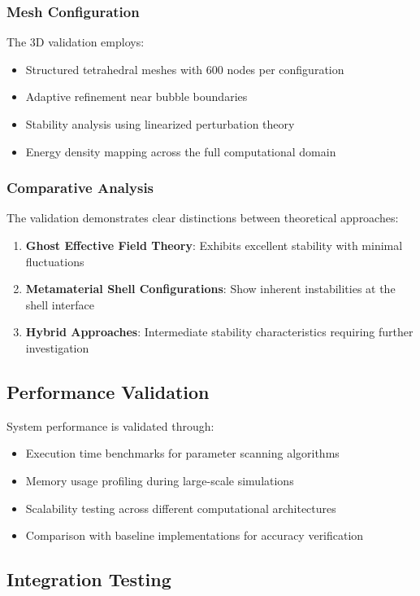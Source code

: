\documentclass[12pt]{article}
\begin{document}
\subsubsection{Mesh Configuration}

The 3D validation employs:
\begin{itemize}
\item Structured tetrahedral meshes with 600 nodes per configuration
\item Adaptive refinement near bubble boundaries
\item Stability analysis using linearized perturbation theory
\item Energy density mapping across the full computational domain
\end{itemize}

\subsubsection{Comparative Analysis}

The validation demonstrates clear distinctions between theoretical approaches:
\begin{enumerate}
\item \textbf{Ghost Effective Field Theory}: Exhibits excellent stability with minimal fluctuations
\item \textbf{Metamaterial Shell Configurations}: Show inherent instabilities at the shell interface
\item \textbf{Hybrid Approaches}: Intermediate stability characteristics requiring further investigation
\end{enumerate}

\subsection{Performance Validation}

System performance is validated through:
\begin{itemize}
\item Execution time benchmarks for parameter scanning algorithms
\item Memory usage profiling during large-scale simulations
\item Scalability testing across different computational architectures
\item Comparison with baseline implementations for accuracy verification
\end{itemize}

\subsection{Integration Testing}
\end{document}
